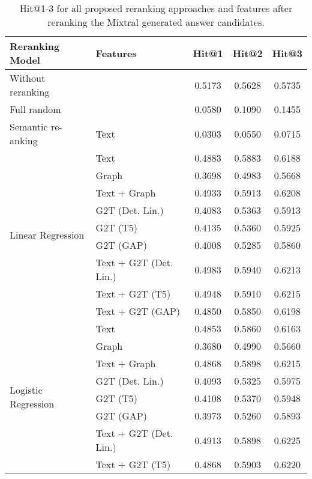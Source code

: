 \begin{table}[htbp]
    \setlength{\tabcolsep}{3pt}
    \caption{Hit@1-3 for all proposed reranking approaches and features after reranking the Mixtral generated answer candidates.}
    \label{tab:controllable_fusion:mixtral_all_results}
    \fontsize{9pt}{11pt}\selectfont
    \centering
    \begin{tabular}{l p{5cm} c c c}
        \toprule
        \textbf{Reranking Model} & \textbf{Features} & \textbf{Hit@1} & \textbf{Hit@2} & \textbf{Hit@3} \\
        \midrule
        Without reranking & & 0.5173 & 0.5628 & 0.5735 \\
        \cmidrule(lr){1-5}
        Full random & & 0.0580 & 0.1090 & 0.1455 \\
        \cmidrule(lr){1-5}
        Semantic re-anking & Text & 0.0303 & 0.0550 & 0.0715 \\
        \cmidrule(lr){1-5}
        \multirow{9}{*}{Linear Regression} & Text & 0.4883 & 0.5883 & 0.6188 \\
        & Graph & 0.3698 & 0.4983 & 0.5668 \\
        & Text + Graph & 0.4933 & 0.5913 & 0.6208 \\
        & G2T (Det. Lin.) & 0.4083 & 0.5363 & 0.5913 \\
        & G2T (T5) & 0.4135 & 0.5360 & 0.5925 \\
        & G2T (GAP) & 0.4008 & 0.5285 & 0.5860 \\
        & Text + G2T (Det. Lin.) & 0.4983 & 0.5940 & 0.6213 \\
        & Text + G2T (T5) & 0.4948 & 0.5910 & 0.6215 \\
        & Text + G2T (GAP) & 0.4850 & 0.5850 & 0.6198 \\
        \midrule
        \multirow{12}{*}{Logistic Regression} & Text & 0.4853 & 0.5860 & 0.6163 \\
        & Graph & 0.3680 & 0.4990 & 0.5660 \\
        & Text + Graph & 0.4868 & 0.5898 & 0.6215 \\
        & G2T (Det. Lin.) & 0.4093 & 0.5325 & 0.5975 \\
        & G2T (T5) & 0.4108 & 0.5370 & 0.5948 \\
        & G2T (GAP) & 0.3973 & 0.5260 & 0.5893 \\
        & Text + G2T (Det. Lin.) & 0.4913 & 0.5898 & 0.6225 \\
        & Text + G2T (T5) & 0.4868 & 0.5903 & 0.6220 \\

\end{tabular}
\end{table}
